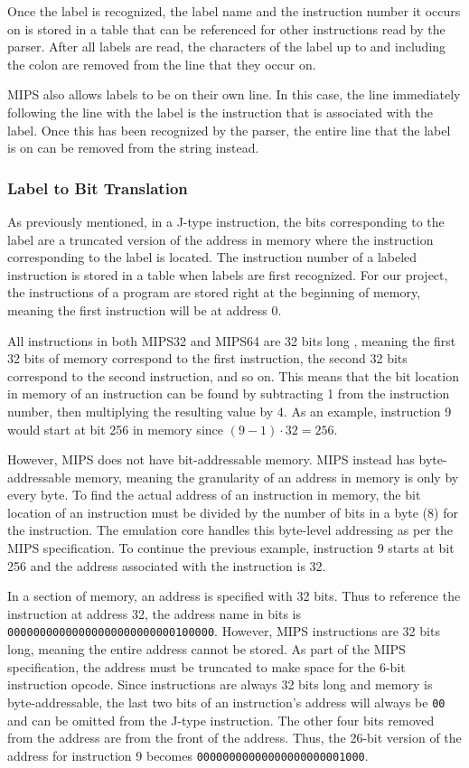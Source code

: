 \documentclass[
    paper=letter,
    parskip=half,
    fontsize=12pt,
    titlepage=firstiscover,
    toc=bibliography,
    numbers=endperiod
]{scrartcl}
\begin{document}
Once the label is recognized, the label name and the instruction number
it occurs on is stored in a table that can be referenced for other
instructions read by the parser. After all labels are read, the
characters of the label up to and including the colon are removed from
the line that they occur on.

MIPS also allows labels to be on their own line. In this case, the line
immediately following the line with the label is the instruction that is
associated with the label. Once this has been recognized by the parser,
the entire line that the label is on can be removed from the string
instead.

\subsubsection{Label to Bit Translation}

As previously mentioned, in a J-type instruction, the bits corresponding
to the label are a truncated version of the address in memory where the
instruction corresponding to the label is located. The instruction
number of a labeled instruction is stored in a table when labels are
first recognized. For our project, the instructions of a program are
stored right at the beginning of memory, meaning the first instruction
will be at address 0.

All instructions in both MIPS32 and MIPS64 are 32 bits long
\cite{brady-instruction-formats}, meaning the first 32 bits of memory
correspond to the first instruction, the second 32 bits correspond to
the second instruction, and so on. This means that the bit location in
memory of an instruction can be found by subtracting 1 from the
instruction number, then multiplying the resulting value by 4. As an
example, instruction 9 would start at bit 256 in memory since $(9 - 1)
    \cdot 32 = 256$.

However, MIPS does not have bit-addressable
\cite{sciencedirect-addressable-memory} memory. MIPS instead has
byte-addressable memory, meaning the granularity of an address in memory
is only by every byte. To find the actual address of an instruction in
memory, the bit location of an instruction must be divided by the number
of bits in a byte (8) for the instruction. The emulation core handles
this byte-level addressing as per the MIPS specification. To continue
the previous example, instruction 9 starts at bit 256 and the address
associated with the instruction is 32.

In a section of memory, an address is specified with 32 bits. Thus to
reference the instruction at address 32, the address name in bits is
\texttt{00000000000000000000000000100000}. However, MIPS instructions
are 32 bits long, meaning the entire address cannot be stored. As part
of the MIPS specification, the address must be truncated to make space
for the 6-bit instruction opcode. Since instructions are always 32 bits
long and memory is byte-addressable, the last two bits of an
instruction's address will always be \texttt{00} and can be omitted from
the J-type instruction. The other four bits removed from the address are
from the front of the address. Thus, the 26-bit version of the address
for instruction 9 becomes \texttt{00000000000000000000001000}.
\end{document}
